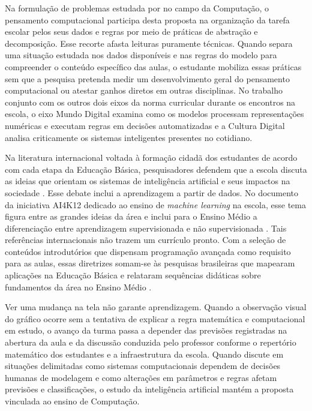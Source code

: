 Na formulação de problemas estudada por  no campo da Computação, o pensamento computacional participa desta proposta na organização da tarefa escolar pelos seus dados e regras por meio de práticas de abstração e decomposição. Esse recorte afasta leituras puramente técnicas. Quando separa uma situação estudada nos dados disponíveis e nas regras do modelo para compreender o conteúdo específico das aulas, o estudante mobiliza essas práticas sem que a pesquisa pretenda medir um desenvolvimento geral do pensamento computacional ou atestar ganhos diretos em outras disciplinas. No trabalho conjunto com os outros dois eixos da norma curricular durante os encontros na escola, o eixo Mundo Digital examina como os modelos processam representações numéricas e executam regras em decisões automatizadas e a Cultura Digital analisa criticamente os sistemas inteligentes presentes no cotidiano.

Na literatura internacional voltada à formação cidadã dos estudantes de acordo com cada etapa da Educação Básica, pesquisadores defendem que a escola discuta as ideias que orientam os sistemas de inteligência artificial e seus impactos na sociedade \cite{touretzky2019envisioning}. Esse debate inclui a aprendizagem a partir de dados. No documento da iniciativa AI4K12 dedicado ao ensino de \textit{machine learning} na escola, esse tema figura entre as grandes ideias da área e inclui para o Ensino Médio a diferenciação entre aprendizagem supervisionada e não supervisionada \cite{touretzky2023machine}. Tais referências internacionais não trazem um currículo pronto. Com a seleção de conteúdos introdutórios que dispensam programação avançada como requisito para as aulas, essas diretrizes somam-se às pesquisas brasileiras que mapearam aplicações na Educação Básica e relataram sequências didáticas sobre fundamentos da área no Ensino Médio \cite{camada2020ensino,duraes2021ensino}.

Ver uma mudança na tela não garante aprendizagem. Quando a observação visual do gráfico ocorre sem a tentativa de explicar a regra matemática e computacional em estudo, o avanço da turma passa a depender das previsões registradas na abertura da aula e da discussão conduzida pelo professor conforme o repertório matemático dos estudantes e a infraestrutura da escola. Quando discute em situações delimitadas como sistemas computacionais dependem de decisões humanas de modelagem e como alterações em parâmetros e regras afetam previsões e classificações, o estudo da inteligência artificial mantém a proposta vinculada ao ensino de Computação.

